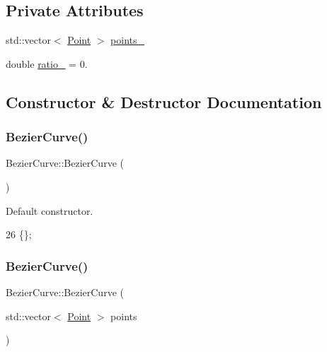 \subsection*{Private Attributes}
\begin{DoxyCompactItemize}
\item 
std\+::vector$<$ \mbox{\hyperlink{class_point}{Point}} $>$ \mbox{\hyperlink{class_bezier_curve_a73c8f89d9002be75295e6a0546547189}{points\+\_\+}}
\item 
double \mbox{\hyperlink{class_bezier_curve_a9a6d08efdae6b77334cb731f6c593142}{ratio\+\_\+}} = 0.
\end{DoxyCompactItemize}


\subsection{Constructor \& Destructor Documentation}
\mbox{\label{class_bezier_curve_af30b8df568e50499b596aff578198425}} 
\subsubsection{\texorpdfstring{Bezier\+Curve()}{BezierCurve()}\hspace{0.1cm}{\footnotesize\ttfamily [1/2]}}
{\footnotesize\ttfamily Bezier\+Curve\+::\+Bezier\+Curve (\begin{DoxyParamCaption}{ }\end{DoxyParamCaption})\hspace{0.3cm}{\ttfamily [inline]}}



Default constructor. 


\begin{DoxyCode}
26 \{\};
\end{DoxyCode}
\mbox{\label{class_bezier_curve_abf9565fc1a6be43b0f1503e2db52ffd1}} 
\subsubsection{\texorpdfstring{Bezier\+Curve()}{BezierCurve()}\hspace{0.1cm}{\footnotesize\ttfamily [2/2]}}
{\footnotesize\ttfamily Bezier\+Curve\+::\+Bezier\+Curve (\begin{DoxyParamCaption}\item[{std\+::vector$<$ \mbox{\hyperlink{class_point}{Point}} $>$}]{points }\end{DoxyParamCaption})}



